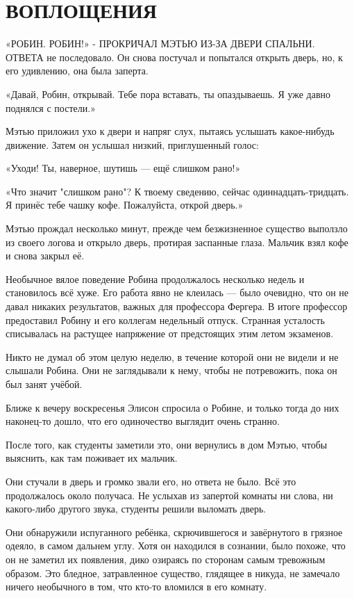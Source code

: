 \documentclass[a4paper,12pt]{book}
\begin{document}
\chapter{ВОПЛОЩЕНИЯ}
\noindent\par«РОБИН. РОБИН!» - ПРОКРИЧАЛ МЭТЬЮ ИЗ-ЗА ДВЕРИ СПАЛЬНИ. ОТВЕТА не последовало. Он снова постучал и попытался открыть дверь, но, к его удивлению, она была заперта.
\par
«Давай, Робин, открывай. Тебе пора вставать, ты опаздываешь. Я уже давно поднялся с постели.»
\par
Мэтью приложил ухо к двери и напряг слух, пытаясь услышать какое-нибудь движение. Затем он услышал низкий, приглушенный голос:
\par
«Уходи! Ты, наверное, шутишь — ещё слишком рано!»
\par
«Что значит "слишком рано"? К твоему сведению, сейчас одиннадцать-тридцать. Я принёс тебе чашку кофе. Пожалуйста, открой дверь.»
\par
Мэтью прождал несколько минут, прежде чем безжизненное существо выползло из своего логова и открыло дверь, протирая заспанные глаза. Мальчик взял кофе и снова закрыл её.\\
\par
Необычное вялое поведение Робина продолжалось несколько недель и становилось всё хуже. Его работа явно не клеилась — было очевидно, что он не давал никаких результатов, важных для профессора Фергера. В итоге профессор предоставил Робину и его коллегам недельный отпуск. Странная усталость списывалась на растущее напряжение от предстоящих этим летом экзаменов.
\par
Никто не думал об этом целую неделю, в течение которой они не видели и не слышали Робина. Они не заглядывали к нему, чтобы не потревожить, пока он был занят учёбой.
\par
Ближе к вечеру воскресенья Элисон спросила о Робине, и только тогда до них наконец-то дошло, что его одиночество выглядит очень странно.
\par
После того, как студенты заметили это, они вернулись в дом Мэтью, чтобы выяснить, как там поживает их мальчик.
\par
Они стучали в дверь и громко звали его, но ответа не было. Всё это продолжалось около получаса. Не услыхав из запертой комнаты ни слова, ни какого-либо другого звука, студенты решили выломать дверь.
\par
Они обнаружили испуганного ребёнка, скрючившегося и завёрнутого в грязное одеяло, в самом дальнем углу. Хотя он находился в сознании, было похоже, что он не заметил их появления, дико озираясь по сторонам самым тревожным образом. Это бледное, затравленное существо, глядящее в никуда, не замечало ничего необычного в том, что кто-то вломился в его комнату.
\end{document}
